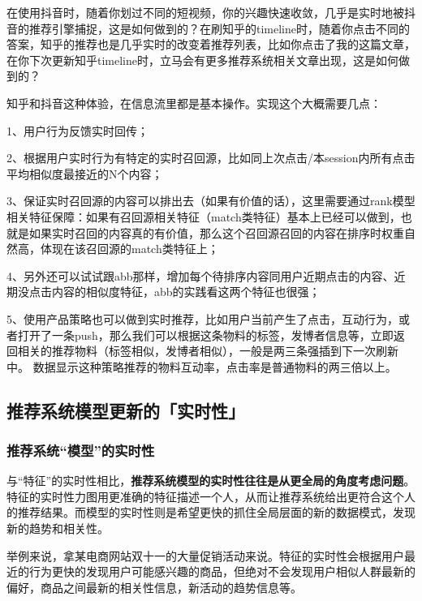 \documentclass[12pt]{article}
\begin{document}
\begin{framed}
在使用抖音时，随着你划过不同的短视频，你的兴趣快速收敛，几乎是实时地被抖音的推荐引擎捕捉，这是如何做到的？在刷知乎的timeline时，随着你点击不同的答案，知乎的推荐也是几乎实时的改变着推荐列表，比如你点击了我的这篇文章，在你下次更新知乎timeline时，立马会有更多推荐系统相关文章出现，这是如何做到的？

知乎和抖音这种体验，在信息流里都是基本操作。实现这个大概需要几点：

1、用户行为反馈实时回传；

2、根据用户实时行为有特定的实时召回源，比如同上次点击/本session内所有点击平均相似度最接近的N个内容；

3、保证实时召回源的内容可以排出去（如果有价值的话），这里需要通过rank模型相关特征保障：如果有召回源相关特征（match类特征）基本上已经可以做到，也就是如果实时召回的内容真的有价值，那么这个召回源召回的内容在排序时权重自然高，体现在该召回源的match类特征上；

4、另外还可以试试跟abb那样，增加每个待排序内容同用户近期点击的内容、近期没点击内容的相似度特征，abb的实践看这两个特征也很强；

5、使用产品策略也可以做到实时推荐，比如用户当前产生了点击，互动行为，或者打开了一条push，那么我们可以根据这条物料的标签，发博者信息等，立即返回相关的推荐物料（标签相似，发博者相似），一般是两三条强插到下一次刷新中。 数据显示这种策略推荐的物料互动率，点击率是普通物料的两三倍以上。
\end{framed}

\subsection{推荐系统模型更新的「实时性」}
\subsubsection{推荐系统“模型”的实时性}
与“特征”的实时性相比，\textbf{推荐系统模型的实时性往往是从更全局的角度考虑问题}。特征的实时性力图用更准确的特征描述一个人，从而让推荐系统给出更符合这个人的推荐结果。而模型的实时性则是希望更快的抓住全局层面的新的数据模式，发现新的趋势和相关性。

\begin{framed}
举例来说，拿某电商网站双十一的大量促销活动来说。特征的实时性会根据用户最近的行为更快的发现用户可能感兴趣的商品，但绝对不会发现用户相似人群最新的偏好，商品之间最新的相关性信息，新活动的趋势信息等。
\end{framed}
\end{document}
